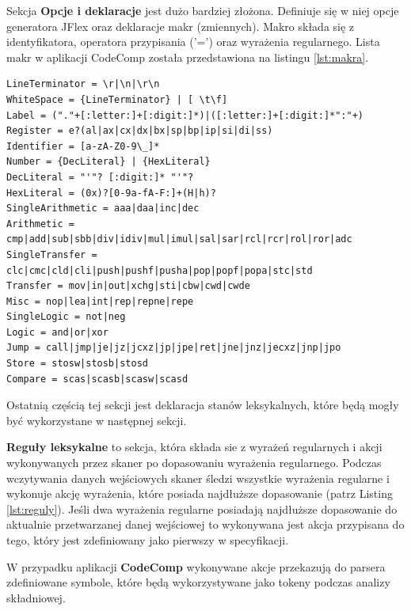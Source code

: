 \documentclass[a4paper,12pt,twoside]{article}
\begin{document}
Sekcja \textbf{Opcje i deklaracje} jest dużo bardziej złożona. Definiuje się w niej opcje generatora JFlex oraz deklaracje makr (zmiennych). Makro składa się z identyfikatora, operatora przypisania ('=') oraz wyrażenia regularnego. Lista makr w aplikacji CodeComp została przedstawiona na listingu \ref{lst:makra}.

\begin{lstlisting}[caption={Makra zdefiniowane w programie CodeComp.}, label={lst:makra}]
LineTerminator = \r|\n|\r\n
WhiteSpace = {LineTerminator} | [ \t\f]
Label = ("."+[:letter:]+[:digit:]*)|([:letter:]+[:digit:]*":"+)
Register = e?(al|ax|cx|dx|bx|sp|bp|ip|si|di|ss)
Identifier = [a-zA-Z0-9\_]*
Number = {DecLiteral} | {HexLiteral}
DecLiteral = "'"? [:digit:]* "'"?
HexLiteral = (0x)?[0-9a-fA-F:]+(H|h)?
SingleArithmetic = aaa|daa|inc|dec
Arithmetic = cmp|add|sub|sbb|div|idiv|mul|imul|sal|sar|rcl|rcr|rol|ror|adc
SingleTransfer = clc|cmc|cld|cli|push|pushf|pusha|pop|popf|popa|stc|std
Transfer = mov|in|out|xchg|sti|cbw|cwd|cwde
Misc = nop|lea|int|rep|repne|repe
SingleLogic = not|neg
Logic = and|or|xor
Jump = call|jmp|je|jz|jcxz|jp|jpe|ret|jne|jnz|jecxz|jnp|jpo
Store = stosw|stosb|stosd
Compare	= scas|scasb|scasw|scasd
\end{lstlisting}

Ostatnią częścią tej sekcji jest deklaracja stanów leksykalnych, które będą mogły być wykorzystane w następnej sekcji.

\textbf{Reguły leksykalne} to sekcja, która składa sie z wyrażeń regularnych i akcji wykonywanych przez skaner po dopasowaniu wyrażenia regularnego. Podczas wczytywania danych wejściowych skaner śledzi wszystkie wyrażenia regularne i wykonuje akcję wyrażenia, które posiada najdłuższe dopasowanie (patrz Listing \ref{lst:reguly}). Jeśli dwa wyrażenia regularne posiadają najdłuższe dopasowanie do aktualnie przetwarzanej danej wejściowej to wykonywana jest akcja przypisana do tego, który jest zdefiniowany jako pierwszy w specyfikacji.

W przypadku aplikacji \textbf{CodeComp} wykonywane akcje przekazują do parsera zdefiniowane symbole, które będą wykorzystywane jako tokeny podczas analizy składniowej.
\end{document}
